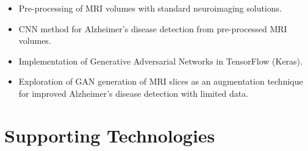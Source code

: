 \documentclass[
    author={Kai Hulme},
    supervisor={Dr Jon Bird},
    degree={BSc},
    title={Generative Adversarial Networks as an Augmentation Technique},
    subtitle={for Alzheimer's Disease Detection in MRI Volumes},
    type={Research},
    year={2021} 
]{dissertation}
\begin{document}
\begin{itemize}
\item Pre-processing of MRI volumes with standard neuroimaging solutions.
\item CNN method for Alzheimer's disease detection from pre-processed MRI volumes.
\item Implementation of Generative Adversarial Networks in TensorFlow (Keras).
\item Exploration of GAN generation of MRI slices as an augmentation technique for improved Alzheimer's disease detection with limited data.
\end{itemize}


\chapter*{Supporting Technologies}
\end{document}
